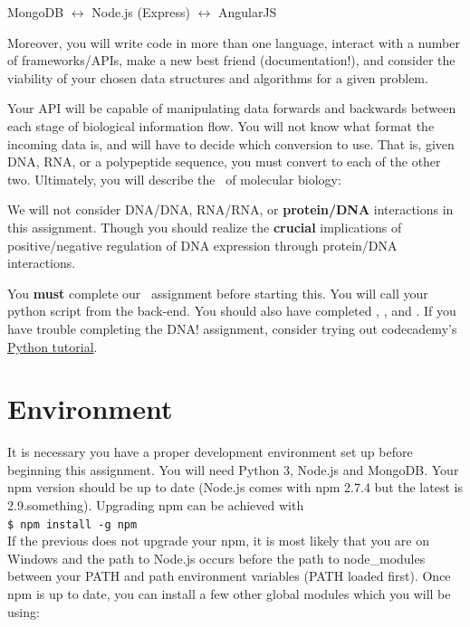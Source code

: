 \begin{center}
    MongoDB $\leftrightarrow$ Node.js (Express) $\leftrightarrow$ AngularJS
\end{center} 

Moreover, you will write code in more than one language, interact with a number
of frameworks/APIs, make a new best friend (documentation!), and consider the
viability of your chosen data structures and algorithms for a given problem. 

Your API will be capable of manipulating data forwards and backwards between
each stage of biological information flow.  You will not know what format the
incoming data is, and will have to decide which conversion to use.  That is,
given DNA, RNA, or a polypeptide sequence, you must convert to each of the other
two.  Ultimately, you will describe the \centraldogma\ of molecular biology:



\mpnote

\noindent We will not consider DNA/DNA, RNA/RNA, or \textbf{protein/DNA}
interactions in this assignment. Though you should realize the \textbf{crucial} 
implications of positive/negative regulation of DNA expression through
protein/DNA interactions.\\


\noindent You \textbf{must} complete our \pythondna\ assignment before starting
this. You will call your python script from the back-end. You should also
have completed \javascripting,  \learnyounode, and \expressworks. If you have
trouble completing the DNA! assignment, consider trying out codecademy's 
\href{http://www.codecademy.com/en/tracks/python}{Python tutorial}.

\section{Environment}

It is necessary you have a proper development environment set up before
beginning this assignment. You will need Python 3, Node.js and MongoDB. Your npm
version should be up to date (Node.js comes with npm 2.7.4 but the latest is
2.9.something). Upgrading npm can be achieved with \\

\noindent \texttt{\$ npm install -g npm} \\

If the previous does not upgrade your npm, it is most likely that you are on
Windows and the path to Node.js occurs before the path to node\_modules between
your PATH and path environment variables (PATH loaded first).  Once npm is up to
date, you can install a few other global modules which you will be using:

